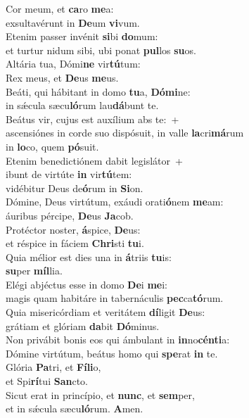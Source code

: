\evenverse Cor meum, et \textbf{ca}ro \textbf{me}a:~\*\\
\evenverse exsultavérunt in \textbf{De}um \textbf{vi}vum.\\
\oddverse Etenim passer invénit \textbf{si}bi \textbf{do}mum:~\*\\
\oddverse et turtur nidum sibi, ubi ponat \textbf{pul}los \textbf{su}os.\\
\evenverse Altária tua, Dómi\textbf{ne} vir\textbf{tú}tum:~\*\\
\evenverse Rex meus, et \textbf{De}us \textbf{me}us.\\
\oddverse Beáti, qui hábitant in domo \textbf{tu}a, \textbf{Dó}\textbf{mi}ne:~\*\\
\oddverse in sǽcula sæcu\textbf{ló}rum lau\textbf{dá}bunt te.\\
\evenverse Beátus vir, cujus est auxílium abs te:~+\\
\evenverse  ascensiónes in corde suo dispósuit, in valle \textbf{la}cri\textbf{má}rum~\*\\
\evenverse in \textbf{lo}co, quem \textbf{pó}suit.\\
\oddverse Etenim benedictiónem dabit legislátor~+\\
\oddverse  ibunt de virtúte \textbf{in} vir\textbf{tú}tem:~\*\\
\oddverse vidébitur Deus de\textbf{ó}rum in \textbf{Si}on.\\
\evenverse Dómine, Deus virtútum, exáudi orati\textbf{ó}nem \textbf{me}am:~\*\\
\evenverse áuribus pércipe, \textbf{De}us \textbf{Ja}cob.\\
\oddverse Protéctor noster, \textbf{á}spice, \textbf{De}us:~\*\\
\oddverse et réspice in fáciem \textbf{Chri}sti \textbf{tu}i.\\
\evenverse Quia mélior est dies una in \textbf{á}triis \textbf{tu}is:~\*\\
\evenverse \textbf{su}per \textbf{míl}lia.\\
\oddverse Elégi abjéctus esse in domo \textbf{De}i \textbf{me}i:~\*\\
\oddverse magis quam habitáre in tabernáculis \textbf{pec}ca\textbf{tó}rum.\\
\evenverse Quia misericórdiam et veritátem \textbf{dí}ligit \textbf{De}us:~\*\\
\evenverse grátiam et glóriam \textbf{da}bit \textbf{Dó}minus.\\
\oddverse Non privábit bonis eos qui ámbulant in \textbf{in}no\textbf{cén}\textbf{ti}a:~\*\\
\oddverse Dómine virtútum, beátus homo qui \textbf{spe}rat \textbf{in} te.\\
\evenverse Glória \textbf{Pa}tri, et \textbf{Fí}\textbf{li}o,~\*\\
\evenverse et Spi\textbf{rí}tui \textbf{San}cto.\\
\oddverse Sicut erat in princípio, et \textbf{nunc}, et \textbf{sem}per,~\*\\
\oddverse et in sǽcula sæcu\textbf{ló}rum. \textbf{A}men.\\
